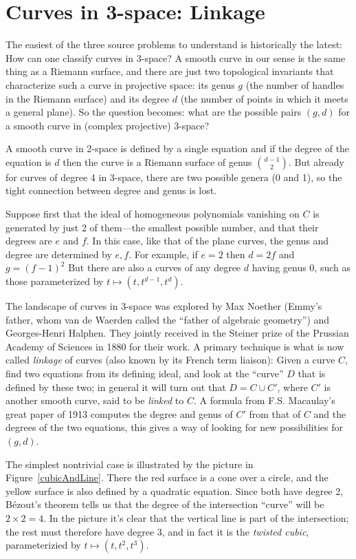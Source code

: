\documentclass[11pt, oneside]{article}   	%
\begin{document}
\section{Curves in 3-space: Linkage} The easiest of the three source problems to understand is historically the latest: How can one classify curves in 3-space? A smooth curve in our sense is the same thing as a Riemann surface, and there are just two topological invariants that characterize such a curve in projective space: its genus $g$ (the number of handles in the Riemann surface) and its degree $d$ (the number of points in which it meets a general plane). So the question becomes: what are the possible pairs $(g,d)$ for a smooth curve in (complex projective) 3-space?

A  smooth curve in 2-space is defined by a single equation and if the degree of the equation is $d$ then the curve is a Riemann surface of genus $d-1\choose 2$.
But already for curves of degree 4 in 3-space, there are two possible genera (0 and 1), so the tight connection between degree and genus is lost.

Suppose first that the ideal of homogeneous polynomials vanishing on $C$ is generated by just 2 of them---the smallest possible number, and that their degrees are $e$ and $f$. In this case,
like that of the plane curves, the genus and degree are determined by $e,f$. For example,
if $e=2$ then $d = 2f$ and $g = (f-1)^{2}$ But there are also a curves of any degree $d$ having genus 0, such as those parameterized by $t \mapsto (t, t^{d-1}, t^{d})$. 

The landscape of curves in 3-space was explored by 
Max Noether (Emmy's father, whom van de Waerden called the ``father of algebraic geometry'') and Georges-Henri Halphen. They jointly received in the Steiner prize of the Prussian Academy of Sciences in 1880 for their work. A primary technique is what is now called \emph{linkage} of curves (also known by its French term liaison):  Given a curve $C$, find two equations from its defining ideal, and look at the ``curve'' $D$ that is defined by these two; in general it will turn out that $D = C\cup C'$, where $C'$ is another smooth curve, said to be \emph{linked} to $C$. A formula from F.S. Macaulay's great paper
of 1913 computes the degree and genus
of $C'$ from that of $C$ and the degrees of the two equations, this gives a way of looking for
new possibilities for $(g,d)$.

The simplest nontrivial case is illustrated by the picture in
Figure~\ref{cubicAndLine}. There the red surface is a cone over a circle, and the yellow surface
is also defined by a quadratic equation. Since both have degree 2, B\'ezout's theorem tells us that the
degree of the intersection ``curve'' will be $2\times 2 = 4$. In the picture it's clear that the vertical line
is part of the intersection; the rest must therefore have degree 3, and in fact it is the \emph{twisted cubic},
parameterizied by $t\mapsto (t, t^{2}, t^{3})$.
\end{document}
